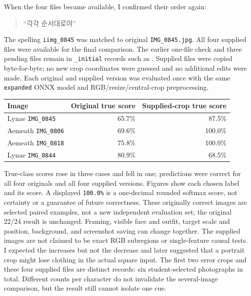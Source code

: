 \documentclass[11pt]{article}
\begin{document}
When the four files became available, I confirmed their order again:
\begin{quote}
``각각 순서대로야''
\end{quote}

The spelling \texttt{iimg\_0845} was matched to original \texttt{IMG\_0845.jpg}. All four supplied files were available for the final comparison. The earlier one-file check and three pending files remain in \texttt{\_initial} records such as . Supplied files were copied byte-for-byte; no new crop coordinates were guessed and no additional edits were made. Each original and supplied version was evaluated once with the same \texttt{expanded} ONNX model and RGB/resize/central-crop preprocessing.

\begin{center}\begin{tabular}{lrr}
\toprule Image & Original true score & Supplied-crop true score \\
\midrule
Lynae \texttt{IMG\_0845} & 65.7\% & 87.5\% \\
Aemeath \texttt{IMG\_0806} & 69.6\% & 100.0\% \\
Aemeath \texttt{IMG\_0818} & 75.8\% & 100.0\% \\
Lynae \texttt{IMG\_0844} & 80.9\% & 68.5\% \\
\bottomrule\end{tabular}\end{center}
True-class scores rose in three cases and fell in one; predictions were correct for all four originals and all four supplied versions. Figures show each chosen label and its score. A displayed \texttt{100.0\%} is a one-decimal rounded softmax score, not certainty or a guarantee of future correctness. These originally correct images are selected paired examples, not a new independent evaluation set; the original 22/24 result is unchanged. Framing, visible face and outfit, target scale and position, background, and screenshot saving can change together. The supplied images are not claimed to be exact RGB subregions or single-feature causal tests. I expected the increases but not the decrease and later suggested that a portrait crop might lose clothing in the actual square input. The first two error crops and these four supplied files are distinct records: six student-selected photographs in total. Different counts per character do not invalidate the several-image comparison, but the result still cannot isolate one cue.

\clearpage
\end{document}
